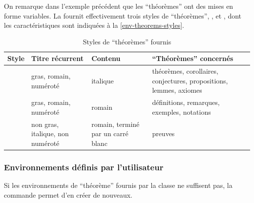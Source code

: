 \documentclass[french,nolocaltoc]{nwejmart}
\newtheorem[style=definition]{fait}
\newtheorem[title=contraventionnalisation]{ctrv}
\newtheorem[title-plural=anneaux]{anneau}
\newtheorem[title-plural=idéaux]{idéal}
\begin{document}
On remarque dans l'exemple précédent que les \enquote{théorèmes} ont des mises
en forme variables. La \nwejmauthorcl{} fournit effectivement trois styles de
\enquote{théorèmes}, ,  et
, dont les caractéristiques sont indiquées à la
\vref{env-theorems-styles}.

\begin{table}
  \centering
  \begin{tabulary}{\linewidth}{lLLL}
    Style                 & Titre récurrent                  & Contenu                            & \enquote{Théorèmes} concernés               \\\toprule
        & gras, romain, numéroté           & italique
                                                                                                  & théorèmes, corollaires, conjectures, propositions, lemmes, axiomes \\\midrule
     & gras, romain, numéroté           & romain                             & définitions, remarques, exemples, notations \\\midrule
          & non gras, italique, non numéroté & romain, terminé par un carré blanc & preuves                                     \\\bottomrule
  \end{tabulary}
  \caption{Styles de \enquote{théorèmes} fournis}
  \label{env-theorems-styles}
\end{table}

\subsubsection{Environnements définis par l'utilisateur}
\label{sec:envir-de-type-1}

Si les environnements de \enquote{théorème} fournis par la classe ne suffisent
pas, la commande  permet d'en créer de nouveaux.
\end{document}
